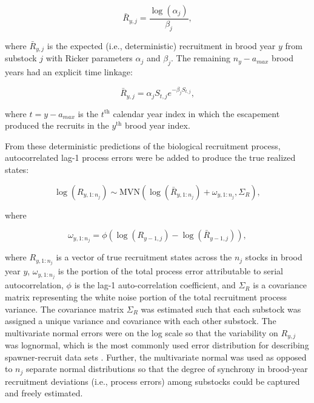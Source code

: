 \documentclass[12pt,]{book}
\theoremstyle{definition}
\theoremstyle{definition}
\theoremstyle{definition}
\theoremstyle{remark}
\begin{document}
\begin{equation}
  \bar{R}_{y,j}=\frac{\log(\alpha_j)}{\beta_j},
  \label{eq:unfished-R0}
\end{equation}

\noindent
where \(\bar{R}_{y,j}\) is the expected (i.e., deterministic)
recruitment in brood year \(y\) from substock \(j\) with Ricker
parameters \(\alpha_j\) and \(\beta_j\). The remaining \(n_y - a_{max}\)
brood years had an explicit time linkage:

\begin{equation}
  \bar{R}_{y,j} = \alpha_j S_{t,j} e^{-\beta_j S_{t,j}},
  \label{eq:tsm-ricker-pred}
\end{equation}

\noindent
where \(t = y-a_{max}\) is the \(t^{\text{th}}\) calendar year index in
which the escapement produced the recruits in the \(y^{\text{th}}\)
brood year index.

From these deterministic predictions of the biological recruitment
process, autocorrelated lag-1 process errors were be added to produce
the true realized states:

\begin{equation}
  \log(R_{y,1:n_j}) \sim \text{MVN}\left(\log(\bar{R}_{y,1:n_j}) + \omega_{y,1:n_j}, \Sigma_R\right),
  \label{eq:tsm-ricker-anomalies}
\end{equation}

\noindent
where

\begin{equation}
  \omega_{y,1:n_j} = \phi \left(\log(R_{y-1,j}) - \log(\bar{R}_{y-1,j}) \right),
  \label{eq:tsm-omega}
\end{equation}

\noindent
where \(R_{y,1:n_j}\) is a vector of true recruitment states across the
\(n_j\) stocks in brood year \(y\), \(\omega_{y,1:n_j}\) is the portion
of the total process error attributable to serial autocorrelation,
\(\phi\) is the lag-1 auto-correlation coefficient, and \(\Sigma_R\) is
a covariance matrix representing the white noise portion of the total
recruitment process variance. The covariance matrix \(\Sigma_R\) was
estimated such that each substock was assigned a unique variance and
covariance with each other substock. The multivariate normal errors were
on the log scale so that the variability on \(R_{y,j}\) was lognormal,
which is the most commonly used error distribution for describing
spawner-recruit data sets \citep{walters-martell-2004}. Further, the
multivariate normal was used as opposed to \(n_j\) separate normal
distributions so that the degree of synchrony in brood-year recruitment
deviations (i.e., process errors) among substocks could be captured and
freely estimated.
\end{document}
